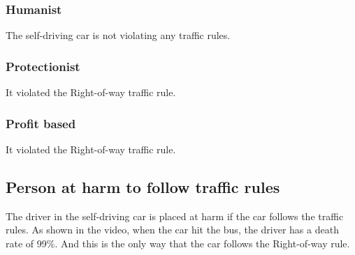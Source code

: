 \documentclass[
	letterpaper, %
]{jdf}
\begin{document}
\subsubsection{Humanist}
The self-driving car is not violating any traffic rules.
\subsubsection{Protectionist}
It violated the Right-of-way traffic rule.
\subsubsection{Profit based}
It violated the Right-of-way traffic rule.
\subsection{Person at harm to follow traffic rules}
The driver in the self-driving car is placed at harm if the car follows the traffic rules. As shown in the video, when the car hit the bus, the driver has a death rate of 99\%. And this is the only way that the car follows the Right-of-way rule. 
\end{document}
